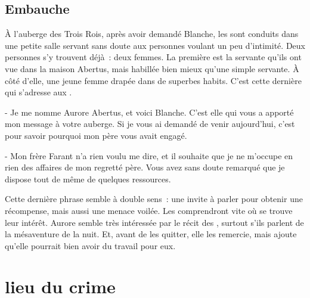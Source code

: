\documentclass[a4paper,10pt,openany]{book}
\begin{document}
\begin{multicols}{2}
\subsection{Embauche}
À l’auberge des Trois Rois, après avoir demandé Blanche, les \PJs sont conduits dans une petite salle servant sans doute aux personnes voulant un peu
d’intimité. Deux personnes s’y trouvent déjà : deux femmes. La première est la servante qu’ils ont vue dans la maison Abertus, mais habillée bien
mieux qu’une simple servante. À côté d’elle, une jeune femme drapée dans de superbes habits. C’est cette dernière qui s’adresse aux \PJs.\par 
\begin{paperbox}{ }
- Je me nomme Aurore Abertus, et voici Blanche. C’est elle qui vous a apporté mon message à votre auberge. Si je vous ai demandé
de venir aujourd’hui, c’est pour savoir pourquoi mon père vous avait engagé.\par\noindent - Mon frère Farant n’a rien voulu me dire, et il souhaite
que je ne m’occupe en rien des affaires de mon regretté père. Vous avez sans doute remarqué que je dispose tout de même de quelques ressources.
\end{paperbox}
Cette dernière phrase semble à double sens : une invite à parler pour obtenir une récompense, mais aussi une menace voilée. Les \PJs comprendront vite
où se trouve leur intérêt. Aurore semble très intéressée par le récit des \PJs, surtout s’ils parlent de la mésaventure de la nuit. Et, avant de les
quitter, elle les remercie, mais ajoute qu’elle pourrait bien avoir du travail pour eux.
\section{lieu du crime}

\end{multicols}
\end{document}
